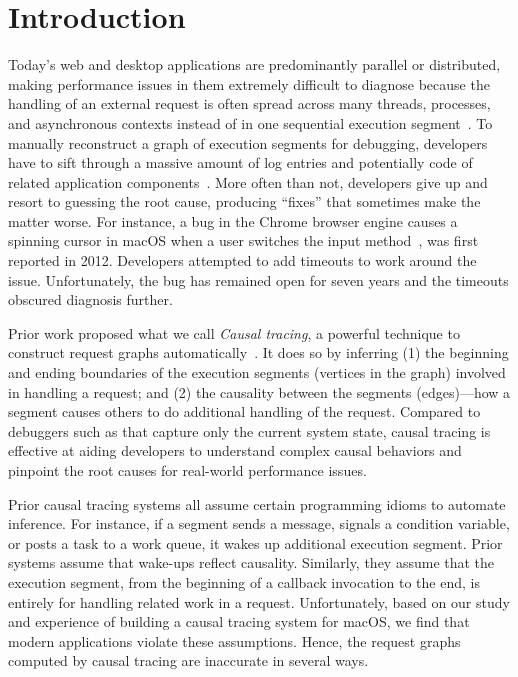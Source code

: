 \section{Introduction} \label{sec:intro}

Today's web and desktop applications are predominantly parallel or
distributed, making performance issues in them extremely difficult to
diagnose because the handling of an external request is often spread across
many threads, processes, and asynchronous contexts instead of in one
sequential execution segment~\cite{harter2012file}. To manually reconstruct
a graph of execution segments for debugging, developers have to sift
through a massive amount of log entries and potentially code of related
application components~\cite{chen2002pinpoint, zhao2016non, xu2009detecting,
nagaraj2012structured, yuan2012conservative}. More often than not, developers
give up and resort to guessing the root cause, producing ``fixes'' that
sometimes make the matter worse. For instance, a bug in the Chrome browser
engine causes a spinning cursor in macOS when a user switches the input
method~\cite{chromiumbugreport}, was first reported in 2012. Developers
attempted to add timeouts to work around the issue. Unfortunately, the bug has
remained open for seven years and the timeouts obscured diagnosis further.

Prior work proposed what we call \emph{Causal tracing}, a powerful technique
to construct request graphs automatically~\cite{reynolds2006pip, fonseca2007x,
benjamin2010dapper, zhang2013panappticon, ravindranath2012appinsight}. It
does so by inferring (1) the beginning and ending boundaries of the execution
segments (vertices in the graph) involved in handling a request; and (2) the
causality between the segments (edges)---how a segment causes others to do
additional handling of the request. Compared to debuggers such as \spindump that
capture only the current system state, causal tracing is effective at aiding
developers to understand complex causal behaviors and pinpoint the root causes
for real-world performance issues.

Prior causal tracing systems all assume certain programming idioms to automate
inference. For instance, if a segment sends a message, signals a condition
variable, or posts a task to a work queue, it wakes up additional execution
segment. Prior systems assume that wake-ups reflect causality. Similarly, they
assume that the execution segment, from the beginning of a callback invocation
to the end, is entirely for handling related work in a request. Unfortunately,
based on our study and experience of building a causal tracing system for macOS,
we find that modern applications violate these assumptions. Hence, the request
graphs computed by causal tracing are inaccurate in several ways.

